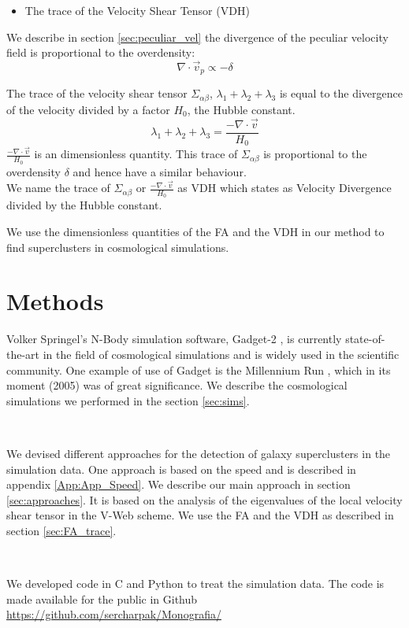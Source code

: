 \documentclass[12pt]{article}
\begin{document}
\begin{itemize}
\item The trace of the Velocity Shear Tensor (VDH)
\end{itemize}

We describe in section \ref{sec:peculiar_vel} the divergence of the peculiar velocity field is proportional to the overdensity:
\[
\nabla \cdot \vec{v}_p \propto - \delta
\]

The trace of the velocity shear tensor $\Sigma
 _{\alpha\beta}$, $\lambda_1 + \lambda_2 + \lambda_3$ is
 equal to the divergence of the velocity divided by a
  factor $H_0$, the Hubble constant.
\[
\lambda_1 + \lambda_2 + \lambda_3 = \frac{- \nabla \cdot \vec{v}}{H_0}
\]
$\frac{- \nabla \cdot \vec{v}}{H_0}$ is an dimensionless quantity. This trace of $\Sigma_{\alpha\beta}$ is
 proportional to the overdensity $\delta$ and hence have
  a similar behaviour.\\

We name the trace of $\Sigma_{\alpha\beta}$ or $\frac{- \nabla \cdot \vec{v}}{H_0}$ as VDH which states as
 Velocity Divergence divided by the Hubble constant. 

We use the dimensionless quantities of the FA and the VDH in our method to find superclusters in cosmological simulations.

\section{Methods}
\begin{par}
Volker Springel's N-Body simulation software,
 Gadget-2 \cite{springel_gadget_2_2005}, is
  currently state-of-the-art in the field of
   cosmological simulations and is widely used in
    the scientific community. One example of use of
     Gadget is the Millennium Run
      \cite{springel_simulations_2005}, which in its
       moment (2005) was of great significance. We
        describe the cosmological simulations we
         performed in the section \ref{sec:sims}.
\end{par}
\\
\begin{par}
We devised different approaches for the detection of
 galaxy superclusters in the simulation data. One
  approach is based on the speed and is described in
   appendix \ref{App:App_Speed}. We describe our
    main approach in section \ref{sec:approaches}.
     It is based on the analysis of the 
    eigenvalues of the local velocity shear tensor
     in the V-Web scheme. We use the FA and the VDH as described in section \ref{sec:FA_trace}. 
\end{par}
\\
\begin{par}
We developed code in C and Python to treat the
 simulation data. The code is made available for the
  public in Github
   \url{https://github.com/sercharpak/Monografia/}
\end{par}
\end{document}
